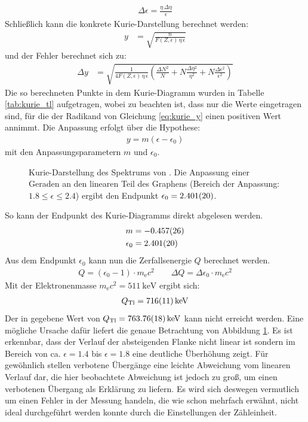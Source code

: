 \documentclass[11pt, a4paper]{article}
\numberwithin{equation}{section}
\begin{document}
\begin{align}
	\Delta \epsilon = \frac{\eta \, \Delta \eta}{\epsilon}
\end{align}
Schließlich kann die konkrete Kurie-Darstellung berechnet werden:
\begin{align}
	y &= \sqrt{\frac{n}{F(Z,\epsilon) \, \eta \, \epsilon}}
	\label{eq:kurie_y}
\end{align}
und der Fehler berechnet sich zu:
\begin{align}
	\Delta y &= 
	\sqrt{\frac{1}{4 F(Z, \epsilon) \, \eta \, \epsilon}
	\left( \frac{\Delta N^2}{N} + N \frac{\Delta \eta^2}{\eta^2} + N \frac{\Delta \epsilon^2}{\epsilon^2} \right)
	}
\end{align}
Die so berechneten Punkte in dem Kurie-Diagramm wurden in Tabelle \ref{tab:kurie_tl} aufgetragen, wobei zu beachten ist, dass nur die Werte eingetragen sind, für die der Radikand von Gleichung \eqref{eq:kurie_y} einen positiven Wert annimmt.
Die Anpassung erfolgt über die Hypothese:
\begin{align}
	y = m (\epsilon - \epsilon_0)
\end{align}
mit den Anpassungsparametern $m$ und $\epsilon_0$.
\begin{figure}[h]
	\centering
	
	\caption{Kurie-Darstellung des Spektrums von . Die Anpassung einer Geraden an den linearen Teil des Graphens (Bereich der Anpassung: $\num{1.8} \leq \epsilon \leq {2.4}$) ergibt den Endpunkt $\epsilon_0 = \num{2.401 +- 0.020}$.}
	\label{fig:thallium_kurie}
\end{figure}
So kann der Endpunkt des Kurie-Diagramms direkt abgelesen werden.
\begin{align}
	m &= \num{-0.457 +- 0.026} \\
	\epsilon_0 &= \num{2.401 +- 0.020}
\end{align}
Aus dem Endpunkt $\epsilon_0$ kann nun die Zerfallsenergie $Q$ berechnet werden.
\begin{align}
	Q = (\epsilon_0 - 1) \cdot m_\mathrm{e} c^2 \qquad
	\Delta Q = \Delta \epsilon_0 \cdot m_\mathrm{e} c^2
	\label{eq:zerfallsenergie}
\end{align}
Mit der Elektronenmasse $m_\mathrm{e} c^2 = \SI{511}{\kilo\electronvolt}$ ergibt sich:
\begin{align}
	Q_\mathrm{Tl} = \SI{716 +- 11}{\kilo\electronvolt}
\end{align}
Der in \cite{tl_literatur} gegebene Wert von $Q_\mathrm{Tl} = \SI{763.76 +- 0.18}{\kilo\electronvolt}$ kann nicht erreicht werden.
Eine mögliche Ursache dafür liefert die genaue Betrachtung von Abbildung \ref{fig:thallium_kurie}.
Es ist erkennbar, dass der Verlauf der absteigenden Flanke nicht linear ist sondern im Bereich von ca. $\epsilon=\num{1.4}$ bis $\epsilon=\num{1.8}$ eine deutliche Überhöhung zeigt.
Für gewöhnlich stellen verbotene Übergänge eine leichte Abweichung vom linearen Verlauf dar, die hier beobachtete Abweichung ist jedoch zu groß, um einen verbotenen Übergang als Erklärung zu liefern.
Es wird sich deswegen vermutlich um einen Fehler in der Messung handeln, die wie schon mehrfach erwähnt, nicht ideal durchgeführt werden konnte durch die Einstellungen der Zähleinheit.
\FloatBarrier
\end{document}
